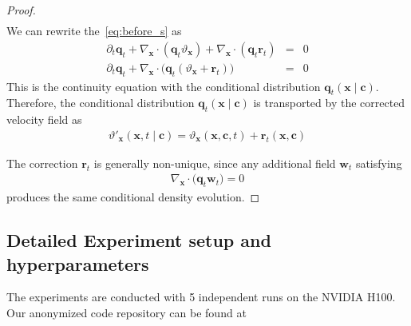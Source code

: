 \documentclass{article} %
\begin{document}
\begin{proof}
\begin{eqnarray}
\end{eqnarray}
We can rewrite the~\eqref{eq:before_s} as
\begin{eqnarray}
    \partial_{t} \mathbf{q}_t + \nabla_{\mathbf{x}} \cdot (\mathbf{q}_t \vartheta_{\mathbf{x}}) + \nabla_{\mathbf{x}} \cdot (\mathbf{q}_t  \mathbf{r}_t ) &=& 0 \\ \nonumber
    \partial_{t} \mathbf{q}_t + \nabla_{\mathbf{x}} \cdot \Big(\mathbf{q}_t (\vartheta_{\mathbf{x}} + \mathbf{r}_{t}) \Big) &=& 0
\end{eqnarray}
This is the continuity equation with the conditional distribution $\mathbf{q}_t (\mathbf{x} \mid \mathbf{c})$. Therefore, the conditional distribution $\mathbf{q}_t(\mathbf{x}\mid\mathbf{c})$ is transported by the corrected velocity field as
\begin{eqnarray}
    \vartheta'_{\mathbf{x}}(\mathbf{x},t \mid \mathbf{c}) = \vartheta_{\mathbf{x}}(\mathbf{x}, \mathbf{c}, t) + \mathbf{r}_t (\mathbf{x}, \mathbf{c})
\end{eqnarray}

The correction $\mathbf{r}_t$ is generally non-unique, since any additional field $\mathbf{w}_t$ satisfying
\begin{eqnarray}
    \nabla_{\mathbf{x}}\cdot\big(\mathbf{q}_t\mathbf{w}_t\big)=0 \nonumber
\end{eqnarray}
produces the same conditional density evolution.
\end{proof}

\subsection{Detailed Experiment setup and hyperparameters}
\label{sec:implementation_details}
The experiments are conducted with 5 independent runs on the NVIDIA H100. Our anonymized code repository can be found at
\end{document}
